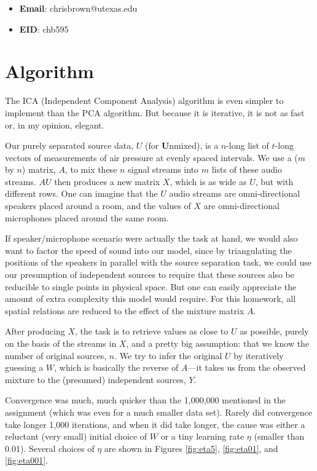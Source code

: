 \documentclass[11pt]{report}
\begin{document}
\begin{itemize}
  \item \textbf{Email}: chrisbrown@utexas.edu
  \item \textbf{EID}: chb595
\end{itemize}

\section{Algorithm}

The ICA (Independent Component Analysis) algorithm is even simpler to implement than the PCA algorithm. But because it is iterative, it is not as fast or, in my opinion, elegant.

Our purely separated source data, $U$ (for \textbf{U}nmixed), is a $n$-long list of $t$-long vectors of measurements of air pressure at evenly spaced intervals. We use a ($m$ by $n$) matrix, $A$, to mix these $n$ signal streams into $m$ lists of these audio streams. $AU$ then produces a new matrix $X$, which is as wide as $U$, but with different rows. One can imagine that the $U$ audio streams are omni-directional speakers placed around a room, and the values of $X$ are omni-directional microphones placed around the same room.

If speaker/microphone scenario were actually the task at hand, we would also want to factor the speed of sound into our model, since by triangulating the positions of the speakers in parallel with the source separation task, we could use our presumption of independent sources to require that these sources also be reducible to single points in physical space. But one can easily appreciate the amount of extra complexity this model would require. For this homework, all spatial relations are reduced to the effect of the mixture matrix $A$.

After producing $X$, the task is to retrieve values as close to $U$ as possible, purely on the basis of the streams in $X$, and a pretty big assumption: that we know the number of original sources, $n$. We try to infer the original $U$ by iteratively guessing a $W$, which is basically the reverse of $A$---it takes us from the observed mixture to the (presumed) independent sources, $Y$.

Convergence was much, much quicker than the 1,000,000 mentioned in the assignment (which was even for a much smaller data set). Rarely did convergence take longer 1,000 iterations, and when it did take longer, the cause was either a reluctant (very small) initial choice of $W$ or a tiny learning rate $\eta$ (smaller than 0.01). Several choices of $\eta$ are shown in Figures \ref{fig:eta5}, \ref{fig:eta01}, and \ref{fig:eta001}.
\end{document}
